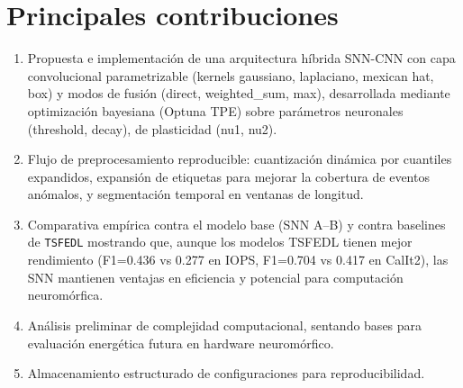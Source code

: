 \section{Principales contribuciones}
\begin{enumerate}
    \item Propuesta e implementación de una arquitectura híbrida SNN-CNN con capa convolucional parametrizable (kernels gaussiano, laplaciano, mexican hat, box) y modos de fusión (direct, weighted\_sum, max), desarrollada mediante optimización bayesiana (Optuna TPE) sobre parámetros neuronales (threshold, decay), de plasticidad (nu1, nu2).
    \item Flujo de preprocesamiento reproducible: cuantización dinámica por cuantiles expandidos, expansión de etiquetas para mejorar la cobertura de eventos anómalos, y segmentación temporal en ventanas de longitud.
    \item Comparativa empírica contra el modelo base (SNN A--B) y contra baselines de \texttt{TSFEDL} mostrando que, aunque los modelos TSFEDL tienen mejor rendimiento (F1=0.436 vs 0.277 en IOPS, F1=0.704 vs 0.417 en CalIt2), las SNN mantienen ventajas en eficiencia y potencial para computación neuromórfica.
    \item Análisis preliminar de complejidad computacional, sentando bases para evaluación energética futura en hardware neuromórfico.
    \item Almacenamiento estructurado de configuraciones para reproducibilidad.
\end{enumerate}

